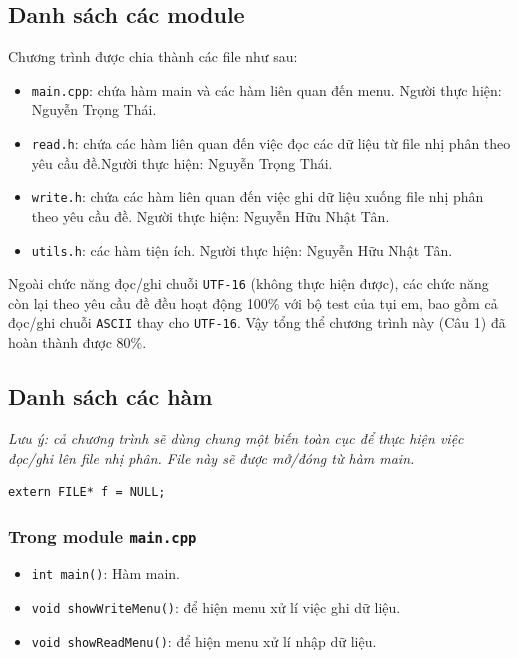 \documentclass[12pt, final]{article}
\newcommand{\code}[1]{\texttt{#1}}
\begin{document}
\subsection{Danh sách các module}
Chương trình được chia thành các file như sau:
\begin{itemize}
    \item \code{main.cpp}: chứa hàm main và các hàm liên quan đến menu. \newline Người thực hiện: Nguyễn Trọng Thái.
    \item \code{read.h}: chứa các hàm liên quan đến việc đọc các dữ liệu từ file nhị phân theo yêu cầu đề.\newline Người thực hiện: Nguyễn Trọng Thái.
    \item \code{write.h}: chứa các hàm liên quan đến việc ghi dữ liệu xuống file nhị phân theo yêu cầu đề.
    \newline Người thực hiện: Nguyễn Hữu Nhật Tân.
    \item \code{utils.h}: các hàm tiện ích. \newline Người thực hiện: Nguyễn Hữu Nhật Tân.
\end{itemize}
Ngoài chức năng đọc/ghi chuỗi \code{UTF-16} (không thực hiện được), các chức năng còn lại theo yêu cầu đề đều hoạt động 100\% với bộ test của tụi em, bao gồm cả đọc/ghi chuỗi \code{ASCII} thay cho \code{UTF-16}.\newline
Vậy tổng thể chương trình này (Câu 1) đã hoàn thành được 80\%.

\subsection{Danh sách các hàm}
\textit{Lưu ý: cả chương trình sẽ dùng chung một biến toàn cục để thực hiện việc đọc/ghi lên file nhị phân. File này sẽ được mở/đóng từ hàm main.}
\begin{verbatim}
extern FILE* f = NULL;
\end{verbatim}

\subsubsection{Trong module \code{main.cpp}}
\begin{itemize}
    \item \code{int main()}: Hàm main.
    \item \code{void showWriteMenu()}: để hiện menu xử lí việc ghi dữ liệu.
    \item \code{void showReadMenu()}: để hiện menu xử lí nhập dữ liệu.
\end{itemize}
\end{document}

